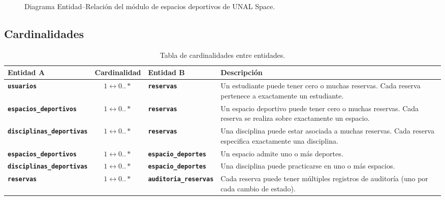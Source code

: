 \documentclass[12pt, a4paper]{article}
\newcommand{\tname}[1]{\texttt{\textbf{#1}}}
\begin{document}
\begin{figure}[H]
{
}%
\caption{Diagrama Entidad--Relación del módulo de espacios deportivos de UNAL Space.}
\label{fig:er-diagram}
\end{figure}


\subsection{Cardinalidades}

\begin{table}[H]
\centering
\renewcommand{\arraystretch}{1.4}
\begin{tabularx}{\textwidth}{l c l X}
    \toprule
    \textbf{Entidad A} & \textbf{Cardinalidad} & \textbf{Entidad B} & \textbf{Descripción} \\
    \midrule
    \tname{usuarios} & $1 \longleftrightarrow 0..*$ & \tname{reservas} &
        Un estudiante puede tener cero o muchas reservas. Cada reserva pertenece a exactamente un estudiante. \\
    \addlinespace
    \tname{espacios\_deportivos} & $1 \longleftrightarrow 0..*$ & \tname{reservas} &
        Un espacio deportivo puede tener cero o muchas reservas. Cada reserva se realiza sobre exactamente un espacio. \\
    \addlinespace
    \tname{disciplinas\_deportivas} & $1 \longleftrightarrow 0..*$ & \tname{reservas} &
        Una disciplina puede estar asociada a muchas reservas. Cada reserva especifica exactamente una disciplina. \\
    \addlinespace
    \tname{espacios\_deportivos} & $1 \longleftrightarrow 0..*$ & \tname{espacio\_deportes} &
        Un espacio admite uno o más deportes. \\
    \addlinespace
    \tname{disciplinas\_deportivas} & $1 \longleftrightarrow 0..*$ & \tname{espacio\_deportes} &
        Una disciplina puede practicarse en uno o más espacios. \\
    \addlinespace
    \tname{reservas} & $1 \longleftrightarrow 0..*$ & \tname{auditoria\_reservas} &
        Cada reserva puede tener múltiples registros de auditoría (uno por cada cambio de estado). \\
    \bottomrule
\end{tabularx}
\caption{Tabla de cardinalidades entre entidades.}
\end{table}
\end{document}
